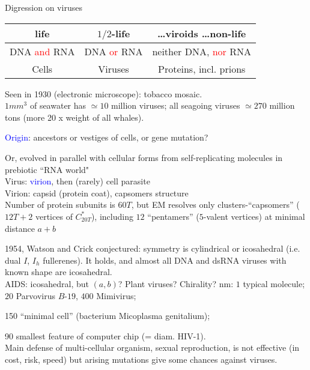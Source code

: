 \documentclass[%
pdf,
colorBG,
slideColor,
]{prosper}
\begin{document}
\begin{slide}{Digression on viruses}
\begin{tabular}{|c|c|c|}
\hline
life          &$1/2$-life    &\dots viroids \dots non-life\\
\hline
DNA \textcolor{red}{and} RNA   &DNA \textcolor{red}{or} RNA    &neither DNA, \textcolor{red}{nor} RNA\\
\hline
Cells         &Viruses       &Proteins, incl. prions\\
\hline
\end{tabular}
Seen in 1930 (electronic microscope): tobacco mosaic.\\
$1mm^3$ of seawater has $\simeq 10 $ million viruses; all seagoing viruses 
$\simeq 270$ million tons (more 20 x weight of all whales).

\textcolor{blue}{Origin}: ancestors or vestiges of cells, or gene mutation? 

Or, evolved in parallel with cellular forms from
self-replicating molecules in prebiotic ``RNA world"\\
Virus: \textcolor{blue}{virion}, then (rarely) cell parasite\\
Virion: capsid (protein coat), capsomers structure\\

Number of protein subunits is $60T$, but EM
resolves only clusters-``capsomers'' ($12T+2$ vertices of
$C_{20T}^*$), including $12$ ``pentamers'' ($5$-valent vertices)
at minimal distance $a+b$

\end{slide}







\begin{slide}{}
1954, Watson and Crick conjectured: symmetry is cylindrical or 
icosahedral
(i.e. dual $I$, $I_h$ fullerenes). It holds, and almost all DNA and 
dsRNA 
viruses with known shape are icosahedral.\\
\vspace{3mm}
AIDS: icosahedral, but $(a,b)$? Plant viruses? Chirality?
nm: $1$ typical molecule; $20$ Parvovirus $B$-$19$, $400$ Mimivirus;

150 ``minimal cell'' (bacterium Micoplasma genitalium);

90 smallest feature of computer chip (= diam. HIV-1).\\
\vspace{3mm}
Main defense of multi-cellular organism, sexual reproduction, 
is not effective (in cost, risk, speed) but arising mutations 
give some chances against viruses.

\end{slide}
\end{document}
